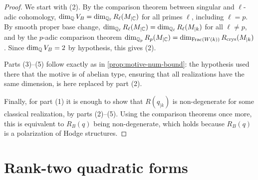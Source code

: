 \begin{proof}
  We start with (2). By the comparison theorem between singular and
  \(\ell\)-adic cohomology, \(\dim_{\mathbb{Q}} V_B = \dim_{\mathbb{Q}_\ell} R_\ell(M_{\vert\mathbb{C}})\)
  for all primes \(\ell\), including \(\ell = p\). By smooth proper base change,
  \(\dim_{\mathbb{Q}_\ell} R_\ell(M_{\vert\mathbb{C}}) = \dim_{\mathbb{Q}_\ell} R_\ell(M_{\vert{k}})\)
  for all \(\ell \neq p\), and by the \(p\)-adic comparison theorem
  \(\dim_{\mathbb{Q}_p} R_p(M_{\vert\mathbb{C}}) = \dim_{\mathrm{Frac}(W(k))} R_{\mathrm{crys}}(M_{\vert{k}})\).
  Since \(\dim_{\mathbb{Q}} V_B = 2\) by hypothesis, this gives (2).

  Parts (3)--(5) follow exactly as in \cref{prop:motive-num-bound}: the
  hypothesis used there that the motive is of abelian type, ensuring that all
  realizations have the same dimension, is here replaced by part (2).

  Finally, for part (1) it is enough to show that \(R(q_{\vert{k}})\) is
  non-degenerate for some classical realization, by parts (2)--(5). Using the
  comparison theorems once more, this is equivalent to \(R_B(q)\) being
  non-degenerate, which holds because \(R_B(q)\) is a polarization of Hodge
  structures.
\end{proof}

\section*{Rank-two quadratic forms}

